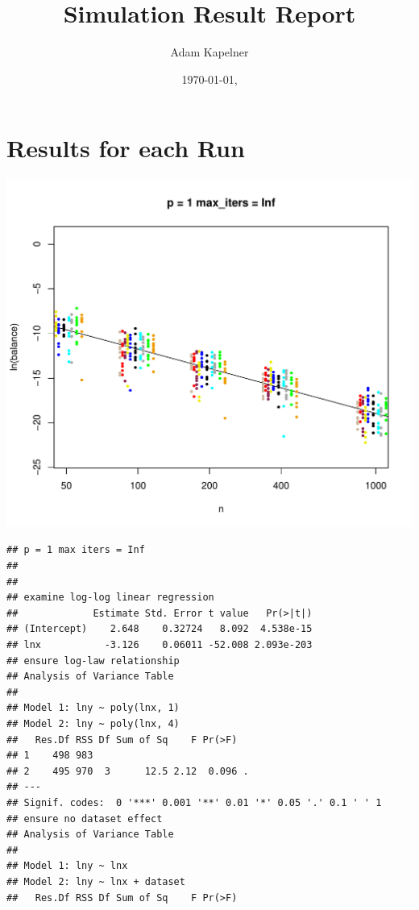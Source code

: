 \documentclass{article}\usepackage[]{graphicx}\usepackage[]{color}
\title{Simulation Result Report}
\author{Adam Kapelner}
\date{\today, \currenttime}
\makeatletter
\def\maxwidth{ %
  \ifdim\Gin@nat@width>\linewidth
    \linewidth
  \else
    \Gin@nat@width
  \fi
}
\newenvironment{kframe}{%
 \def\at@end@of@kframe{}%
 \ifinner\ifhmode%
  \def\at@end@of@kframe{\end{minipage}}%
  \begin{minipage}{\columnwidth}%
 \fi\fi%
 \def\FrameCommand##1{\hskip\@totalleftmargin \hskip-\fboxsep
 \colorbox{shadecolor}{##1}\hskip-\fboxsep
     \hskip-\linewidth \hskip-\@totalleftmargin \hskip\columnwidth}%
 \MakeFramed {\advance\hsize-\width
   \@totalleftmargin\z@ \linewidth\hsize
   \@setminipage}}%
 {\par\unskip\endMakeFramed%
 \at@end@of@kframe}
\newenvironment{knitrout}{}{} %
\makeatother
\begin{document}
\maketitle






\section{Results for each Run}

\begin{knitrout}
\color{fgcolor}
\includegraphics[width=\maxwidth]{figure/load_and_cleanup_data1} 
\begin{kframe}\begin{verbatim}
## p = 1 max iters = Inf 
## 
## 
## examine log-log linear regression
##             Estimate Std. Error t value   Pr(>|t|)
## (Intercept)    2.648    0.32724   8.092  4.538e-15
## lnx           -3.126    0.06011 -52.008 2.093e-203
## ensure log-law relationship
## Analysis of Variance Table
## 
## Model 1: lny ~ poly(lnx, 1)
## Model 2: lny ~ poly(lnx, 4)
##   Res.Df RSS Df Sum of Sq    F Pr(>F)  
## 1    498 983                           
## 2    495 970  3      12.5 2.12  0.096 .
## ---
## Signif. codes:  0 '***' 0.001 '**' 0.01 '*' 0.05 '.' 0.1 ' ' 1
## ensure no dataset effect
## Analysis of Variance Table
## 
## Model 1: lny ~ lnx
## Model 2: lny ~ lnx + dataset
##   Res.Df RSS Df Sum of Sq    F Pr(>F)  

\end{verbatim}
\end{kframe}
\end{knitrout}
\end{document}
